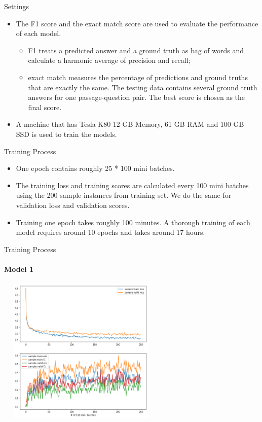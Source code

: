 \documentclass{beamer}
\begin{document}
\begin{frame}{Settings}
    \begin{itemize}
        \item The F1 score and the exact match score are used to evaluate the performance of each model.
            \begin{itemize}
                \item F1 treats a predicted answer and a ground truth as bag of words and calculate a harmonic average of precision and recall;
                \item exact match measures the percentage of predictions and ground truths that are exactly the same. The testing data contains several ground truth answers for one passage-question pair. The best score is chosen as the final score.
            \end{itemize}
        \item A machine that has Tesla K80 12 GB Memory, 61 GB RAM and 100 GB SSD is used to train the models.
    \end{itemize}
\end{frame}

\begin{frame}{Training Process}
    \begin{itemize}
        \item One epoch contains roughly 25 * 100 mini batches.
        \item The training loss and training scores are calculated every 100 mini batches using the 200 sample instances from training set. We do the same for validation loss and validation scores.
        \item Training one epoch takes roughly 100 minutes. A thorough training of each model requires around 10 epochs and takes around 17 hours.
    \end{itemize}
\end{frame}

\begin{frame}{Training Process}\framesubtitle{Model 1}
    \begin{center}
        \includegraphics[width=8cm, height=7cm]{figures/match_corrected.png}
    \end{center}

\end{frame}
\end{document}
